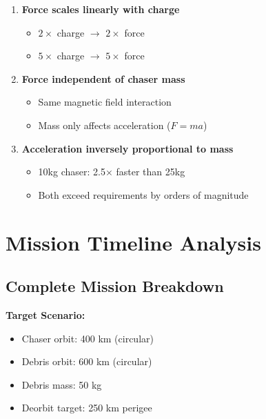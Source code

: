 \documentclass[11pt,a4paper]{article}
\begin{document}
\begin{enumerate}[leftmargin=*]
    \item \textbf{Force scales linearly with charge}
    \begin{itemize}
        \item $2\times$ charge $\rightarrow$ $2\times$ force
        \item $5\times$ charge $\rightarrow$ $5\times$ force
    \end{itemize}

    \item \textbf{Force independent of chaser mass}
    \begin{itemize}
        \item Same magnetic field interaction
        \item Mass only affects acceleration ($F = ma$)
    \end{itemize}

    \item \textbf{Acceleration inversely proportional to mass}
    \begin{itemize}
        \item 10kg chaser: 2.5$\times$ faster than 25kg
        \item Both exceed requirements by orders of magnitude
    \end{itemize}
\end{enumerate}

\section{Mission Timeline Analysis}

\subsection{Complete Mission Breakdown}

\textbf{Target Scenario:}
\begin{itemize}[leftmargin=*]
    \item Chaser orbit: 400 km (circular)
    \item Debris orbit: 600 km (circular)
    \item Debris mass: 50 kg
    \item Deorbit target: 250 km perigee
\end{itemize}
\end{document}

